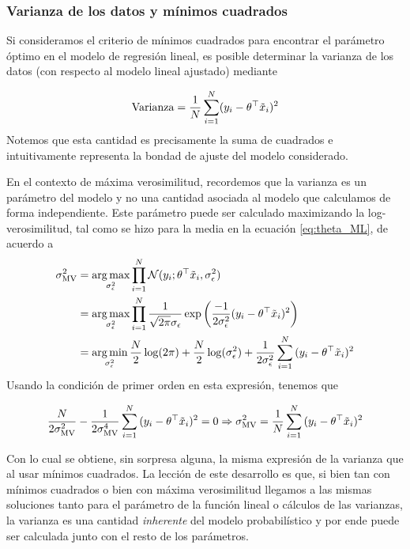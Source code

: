 \subsubsection{Varianza de los datos y mínimos cuadrados} %
\label{ssub:var_min_cuad}

Si consideramos el criterio de mínimos cuadrados para encontrar el parámetro óptimo en el modelo de regresión lineal, es posible determinar la varianza de los datos (con respecto al modelo lineal ajustado) mediante 

\begin{equation}
	\text{Varianza} = \frac{1}{N}\sum_{i=1}^N (y_i-\theta^\top\tilde{x}_i)^2
\end{equation}
Notemos que esta cantidad es precisamente la suma de cuadrados e intuitivamente representa la bondad de ajuste del modelo considerado. 

En el contexto de máxima verosimilitud, recordemos que la varianza es un parámetro del modelo y no una cantidad asociada al modelo que calculamos de forma independiente. Este parámetro puede ser calculado maximizando la log-verosimilitud, tal como se hizo para la media en la ecuación \eqref{eq:theta_ML}, de acuerdo a
\begin{align}
	\sigma^2_{\text{MV}} 	&= \operatorname*{arg\,max}_{\sigma_\epsilon^2} \prod_{i=1}^N {\mathcal N}(y_i;\theta^\top\tilde{x}_i,\sigma_\epsilon^2) \label{eq:sigma_ML}\\
						&= \operatorname*{arg\,max}_{\sigma_\epsilon^2} \prod_{i=1}^N \frac{1}{\sqrt{2\pi}\sigma_\epsilon} \exp\left({\frac{-1}{2\sigma_\epsilon^2}(y_i-\theta^\top\tilde{x}_i)^2}\right) \nonumber\\
						&= \operatorname*{arg\,min}_{\sigma_\epsilon^2} \frac{N}{2} \log(2\pi) +\frac{N}{2} \log(\sigma_\epsilon^{2}) + \frac{1}{2\sigma_\epsilon^2}\sum_{i=1}^N {(y_i-\theta^\top\tilde{x}_i)^2} \nonumber
\end{align}
Usando la condición de primer orden en esta expresión, tenemos que

	
\begin{align}
	\frac{N}{2\sigma^2_{\text{MV}}} - \frac{1}{2\sigma^4_{\text{MV}}}\sum_{i=1}^N {(y_i-\theta^\top\tilde{x}_i)^2} = 0 \Rightarrow \sigma^2_{\text{MV}} = \frac{1}{N}\sum_{i=1}^N {(y_i-\theta^\top\tilde{x}_i)^2}
\end{align}

Con lo cual se obtiene, sin sorpresa alguna, la misma expresión de la varianza que al usar mínimos cuadrados. La lección de este desarrollo es que, si bien tan con mínimos cuadrados o bien con máxima verosimilitud llegamos a las mismas soluciones tanto para el parámetro de la función lineal o cálculos de las varianzas, la varianza es una cantidad \emph{inherente} del modelo probabilístico y por ende puede ser calculada junto con el resto de los parámetros. 

